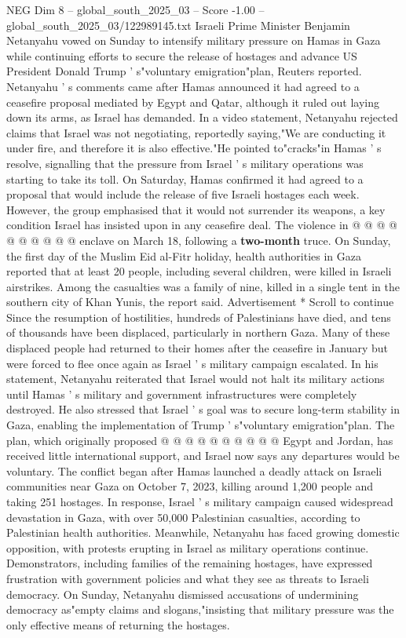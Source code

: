 \begin{textsample}{NEG Dim 8 – global\_south\_2025\_03 – Score -1.00 – global\_south\_2025\_03/122989145.txt}  \label{ex:f8_neg_078}
Israeli Prime Minister Benjamin Netanyahu vowed on Sunday to intensify military pressure on Hamas in Gaza while continuing efforts to secure the release of hostages and advance US President Donald Trump ' s"voluntary emigration"plan, Reuters reported.
Netanyahu ' s comments came after Hamas announced it had agreed to a ceasefire proposal mediated by Egypt and Qatar, although it ruled out laying down its arms, as Israel has demanded.
In a video statement, Netanyahu rejected claims that Israel was not negotiating, reportedly saying,"We are conducting it under fire, and therefore it is also effective."He pointed to"cracks"in Hamas ' s resolve, signalling that the pressure from Israel ' s military operations was starting to take its toll.
On Saturday, Hamas confirmed it had agreed to a proposal that would include the release of five Israeli hostages each week.
However, the group emphasised that it would not surrender its weapons, a key condition Israel has insisted upon in any ceasefire deal.
The violence in @ @ @ @ @ @ @ @ @ @ enclave on March 18, following a \textbf{two-month} truce.
On Sunday, the first day of the Muslim Eid al-Fitr holiday, health authorities in Gaza reported that at least 20 people, including several children, were killed in Israeli airstrikes.
Among the casualties was a family of nine, killed in a single tent in the southern city of Khan Yunis, the report said.
Advertisement * Scroll to continue Since the resumption of hostilities, hundreds of Palestinians have died, and tens of thousands have been displaced, particularly in northern Gaza.
Many of these displaced people had returned to their homes after the ceasefire in January but were forced to flee once again as Israel ' s military campaign escalated.
In his statement, Netanyahu reiterated that Israel would not halt its military actions until Hamas ' s military and government infrastructures were completely destroyed.
He also stressed that Israel ' s goal was to secure long-term stability in Gaza, enabling the implementation of Trump ' s"voluntary emigration"plan.
The plan, which originally proposed @ @ @ @ @ @ @ @ @ @ Egypt and Jordan, has received little international support, and Israel now says any departures would be voluntary.
The conflict began after Hamas launched a deadly attack on Israeli communities near Gaza on October 7, 2023, killing around 1,200 people and taking 251 hostages.
In response, Israel ' s military campaign caused widespread devastation in Gaza, with over 50,000 Palestinian casualties, according to Palestinian health authorities.
Meanwhile, Netanyahu has faced growing domestic opposition, with protests erupting in Israel as military operations continue.
Demonstrators, including families of the remaining hostages, have expressed frustration with government policies and what they see as threats to Israeli democracy.
On Sunday, Netanyahu dismissed accusations of undermining democracy as"empty claims and slogans,"insisting that military pressure was the only effective means of returning the hostages.

\end{textsample}

